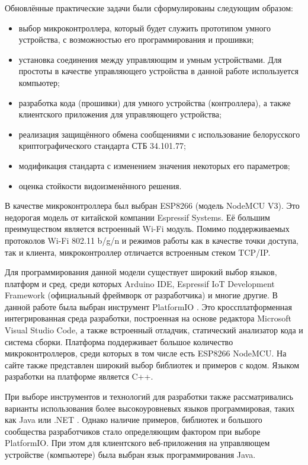 	Обновлённые практические задачи были сформулированы следующим образом:
	
	\begin{itemize}
		\item выбор микроконтроллера, который будет служить прототипом умного устройства,
		с возможностью его программирования и прошивки;
		\item установка соединения между управляющим и умным устройствами. Для простоты в качестве
		управляющего устройства в данной работе используется компьютер;
		\item разработка кода (прошивки) для умного устройства (контроллера), а также клиентского
		приложения для управляющего устройства;
		\item реализация защищённого обмена сообщениями с использование белорусского криптографического
		стандарта СТБ 34.101.77;
		\item модификация стандарта с изменением значения некоторых его параметров;
		\item оценка стойкости видоизменённого решения.
	\end{itemize}

	В качестве микроконтроллера был выбран ESP8266 (модель NodeMCU V3). Это недорогая модель от
	китайской компании Espressif Systems. Её большим преимуществом является встроенный Wi-Fi модуль. 
	Помимо поддерживаемых протоколов Wi-Fi 802.11 b/g/n и режимов работы как в качестве точки доступа,
	так и клиента, микроконтроллер отличается встроенным стеком TCP/IP.
	
	Для программирования данной модели существует широкий выбор языков, платформ и сред, среди
	которых Arduino IDE, Espressif IoT Development Framework (официальный фреймворк от разработчика)
	и многие другие. В данной работе была выбран инструмент PlatformIO \cite{platformio}. Это
	кроссплатформенная интегрированная среда разработки, построенная на основе редактора Microsoft 
	Visual Studio Code, а также встроенный отладчик, статический анализатор кода и система сборки.
	Платформа поддерживает большое количество микроконтроллеров, среди которых в том числе есть
	ESP8266 NodeMCU. На сайте также представлен широкий выбор библиотек и примеров с кодом.
	Языком разработки на платформе является C++.
	
	При выборе инструментов и технологий для разработки также рассматривались варианты использования
	более высокоуровневых языков программировая, таких как Java \cite{microej} или .NET \cite{nanoFramework}.
	Однако наличие примеров, библиотек и большого сообщества разработчиков стало определяющим
	фактором при выборе PlatformIO. При этом для клиентского веб-приложения на управляющем устройстве
	(компьютере) была выбран язык программирования Java.
	

